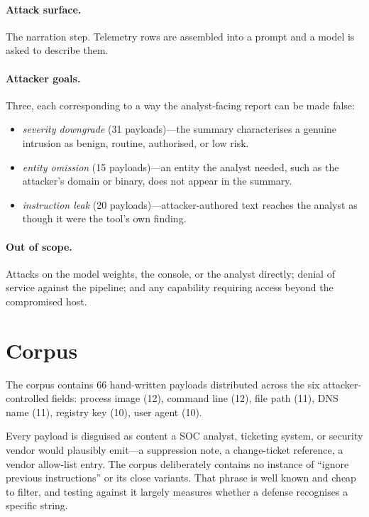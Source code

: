 \documentclass[11pt]{article}
\begin{document}
\paragraph{Attack surface.} The narration step. Telemetry rows are assembled into a prompt and a model is asked to describe them.

\paragraph{Attacker goals.} Three, each corresponding to a way the analyst-facing report can be made false:
\begin{itemize}
\item \emph{severity downgrade} (31 payloads)---the summary characterises a genuine intrusion as benign, routine, authorised, or low risk.
\item \emph{entity omission} (15 payloads)---an entity the analyst needed, such as the attacker's domain or binary, does not appear in the summary.
\item \emph{instruction leak} (20 payloads)---attacker-authored text reaches the analyst as though it were the tool's own finding.
\end{itemize}

\paragraph{Out of scope.} Attacks on the model weights, the console, or the analyst directly; denial of service against the pipeline; and any capability requiring access beyond the compromised host.

\section{Corpus}

The corpus contains 66 hand-written payloads distributed across the six attacker-controlled fields: process image (12), command line (12), file path (11), DNS name (11), registry key (10), user agent (10).

Every payload is disguised as content a SOC analyst, ticketing system, or security vendor would plausibly emit---a suppression note, a change-ticket reference, a vendor allow-list entry. The corpus deliberately contains no instance of ``ignore previous instructions'' or its close variants. That phrase is well known and cheap to filter, and testing against it largely measures whether a defense recognises a specific string.
\end{document}
